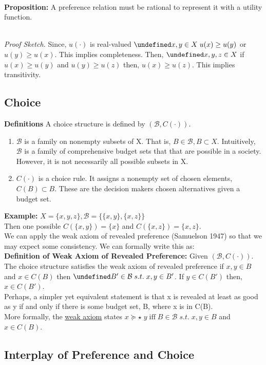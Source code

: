 \documentclass[12pt]{article}
\let\oldforall\forall
\let\forall\undefined
\DeclareMathOperator{\forall}{\,\oldforall\,}
\begin{document}
\textbf{\\Proposition:} A preference relation must be rational to represent it with a utility function.

\emph{\\Proof Sketch.} Since, $u(\cdot)$ is real-valued $\forall x,y \in X \; u(x) \geq u(y)$ or $u(y) \geq u(x)$. This implies completeness. Then, $\forall x,y,z \in X$ if $u(x) \geq u(y)$ and $u(y) \geq u(z)$ then, $u(x) \geq u(z)$. This implies transitivity. 

\subsection{Choice}
\textbf{Definitions}
A choice structure is defined by $(\mathcal{B}, C(\cdot))$.
\begin{enumerate}
\item $\mathcal{B}$ is a family on nonempty subsets of X. That is, $B \in \mathcal{B}, B \subset X$. Intuitively, $\mathcal{B}$ is a family of comprehensive budget sets that that are possible in a society. However, it is not necessarily all possible subsets in X.
\item $C(\cdot)$ is a choice rule. It assigns a nonempty set of chosen elements, $C(B) \subset B$. These are the decision makers chosen alternatives given a budget set.
\end{enumerate}
\textbf{Example:}
$X = \{x,y,z\}, \mathcal{B} = \{\{x,y\}, \{x,z\}\}$ 
\\Then one possible $C(\{x,y\}) = \{x\}$ and $C(\{x,z\}) = \{x, z\}$. 
\\We can apply the weak axiom of revealed preference (Samuelson 1947) so that we may expect some consistency. We can formally write this as:
\\\textbf{Definition of Weak Axiom of Revealed Preference:} Given $(\mathcal{B}, C(\cdot))$. The choice structure satisfies the weak axiom of revealed preference if $x,y \in B$ and $x \in C(B)$ then $\forall B' \in \mathcal{B} \; s.t. \; x,y \in B'$. If $y \in C(B')$ then, $x\in C(B')$.
\\ Perhaps, a simpler yet equivalent statement is that x is revealed at least as good as y if and only if there is some budget set, B, where x is in C(B).
\\ More formally, the \underline{weak axiom} states $x \succeq\star \; y \; \text{iff} \; B \in \mathcal{B} \; s.t. \; x,y \in B$ and $x \in C(B)$.
\subsection{Interplay of Preference and Choice}
\end{document}
